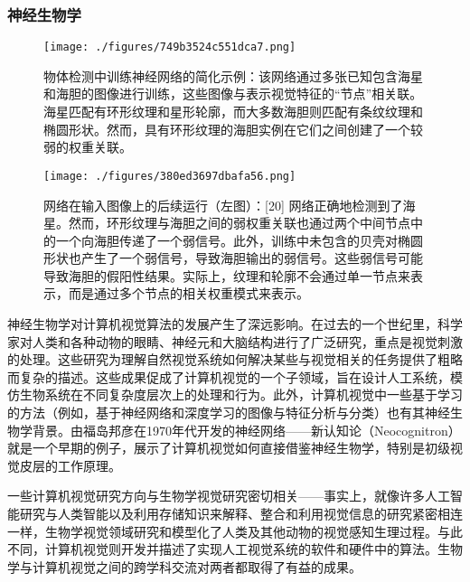 \subsubsection{神经生物学}
\begin{figure}[ht]
\centering
\texttt{[image: ./figures/749b3524c551dca7.png]}
\caption{物体检测中训练神经网络的简化示例：该网络通过多张已知包含海星和海胆的图像进行训练，这些图像与表示视觉特征的“节点”相关联。海星匹配有环形纹理和星形轮廓，而大多数海胆则匹配有条纹纹理和椭圆形状。然而，具有环形纹理的海胆实例在它们之间创建了一个较弱的权重关联。} \label{fig_JSJ_2}
\end{figure}
\begin{figure}[ht]
\centering
\texttt{[image: ./figures/380ed3697dbafa56.png]}
\caption{网络在输入图像上的后续运行（左图）：[20] 网络正确地检测到了海星。然而，环形纹理与海胆之间的弱权重关联也通过两个中间节点中的一个向海胆传递了一个弱信号。此外，训练中未包含的贝壳对椭圆形状也产生了一个弱信号，导致海胆输出的弱信号。这些弱信号可能导致海胆的假阳性结果。实际上，纹理和轮廓不会通过单一节点来表示，而是通过多个节点的相关权重模式来表示。} \label{fig_JSJ_3}
\end{figure}
神经生物学对计算机视觉算法的发展产生了深远影响。在过去的一个世纪里，科学家对人类和各种动物的眼睛、神经元和大脑结构进行了广泛研究，重点是视觉刺激的处理。这些研究为理解自然视觉系统如何解决某些与视觉相关的任务提供了粗略而复杂的描述。这些成果促成了计算机视觉的一个子领域，旨在设计人工系统，模仿生物系统在不同复杂度层次上的处理和行为。此外，计算机视觉中一些基于学习的方法（例如，基于神经网络和深度学习的图像与特征分析与分类）也有其神经生物学背景。由福岛邦彦在1970年代开发的神经网络——新认知论（Neocognitron）就是一个早期的例子，展示了计算机视觉如何直接借鉴神经生物学，特别是初级视觉皮层的工作原理。

一些计算机视觉研究方向与生物学视觉研究密切相关——事实上，就像许多人工智能研究与人类智能以及利用存储知识来解释、整合和利用视觉信息的研究紧密相连一样，生物学视觉领域研究和模型化了人类及其他动物的视觉感知生理过程。与此不同，计算机视觉则开发并描述了实现人工视觉系统的软件和硬件中的算法。生物学与计算机视觉之间的跨学科交流对两者都取得了有益的成果。


